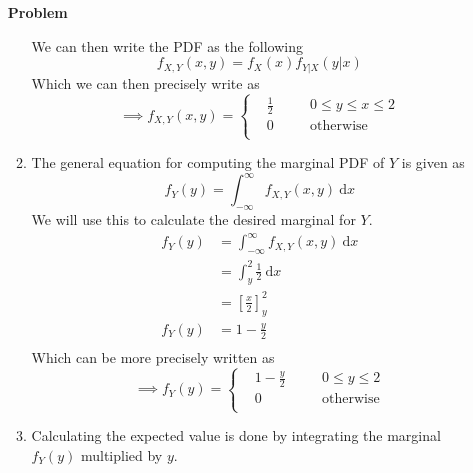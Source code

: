\documentclass[12pt]{article}
\newenvironment{Ex}{\textbf{Problem}\vspace{.75em}\\}{}
\newcommand{\dd}[1]{\:\mathrm{d}{#1}}
\begin{document}
\begin{enumerate}
\begin{Ex}
\begin{solution}
\begin{enumerate}
        We can then write the PDF as the following
        \begin{equation}
          \label{eq:3a-presol}
          f_{X,Y}(x,y) = f_X(x)f_{Y|X}(y|x)
        \end{equation}
        Which we can then precisely write as
        \begin{equation}
          \label{eq:3a-sol}
          \implies f_{X,Y}(x,y) = \left\{
            \begin{aligned}
              & \frac{1}{2} && \quad 0 \le y \le x \le 2 \\
              & 0 &&\quad\text{otherwise} \\
            \end{aligned} \right.
        \end{equation}
      \item The general equation for computing the marginal PDF of $Y$
        is given as
        \begin{equation}
          \label{eq:3b-general-marginal}
          f_Y(y) = \int_{-\infty}^{\infty} f_{X,Y}(x,y) \dd{x}
        \end{equation}
        We will use this to calculate the desired marginal for $Y$.
        \begin{equation}
          \label{eq:3b-presol}
          \begin{aligned}
            f_Y(y) &= \int_{-\infty}^{\infty} f_{X,Y}(x,y) \dd{x} \\
            &= \int_{y}^{2} \frac{1}{2} \dd{x} \\
            &= \left[\frac{x}{2}\right]_y^2 \\
            f_Y(y) &= 1 - \frac{y}{2} \\
          \end{aligned}
        \end{equation}
        Which can be more precisely written as
        \begin{equation}
          \label{eq:3b-sol}
          \implies f_Y(y) = \left\{
            \begin{aligned}
              & 1 - \frac{y}{2} &&\quad 0 \le y \le 2 \\
              & 0 &&\quad\text{otherwise} \\
            \end{aligned} \right.
        \end{equation}
      \item Calculating the expected value is done by integrating the
        marginal $f_Y(y)$ multiplied by $y$.

\end{enumerate}
\end{solution}
\end{Ex}
\end{enumerate}
\end{document}
